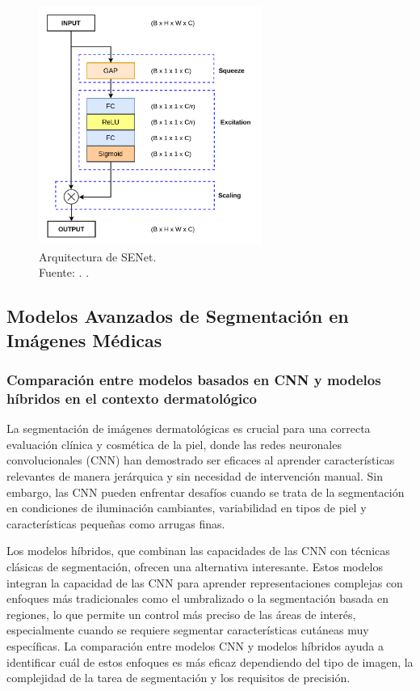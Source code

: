 \begin{itemize}
	\begin{figure}[H]
		\begin{center}
			\includegraphics[width=0.65\textwidth]{2/figures/senet.png}
			\caption[Arquitectura de SENet]{Arquitectura de SENet.\\
			Fuente: \cite{autor2022cnn}. .}
			\label{2:figarqsenet}
		\end{center}
	\end{figure}

\end{itemize}


\subsection{Modelos Avanzados de Segmentación en Imágenes Médicas}
%
\subsubsection{Comparación entre modelos basados en CNN y modelos híbridos en el contexto dermatológico}
La segmentación de imágenes dermatológicas es crucial para una correcta evaluación clínica y cosmética de la piel, donde las redes neuronales convolucionales (CNN) han demostrado ser eficaces al aprender características relevantes de manera jerárquica y sin necesidad de intervención manual. Sin embargo, las CNN pueden enfrentar desafíos cuando se trata de la segmentación en condiciones de iluminación cambiantes, variabilidad en tipos de piel y características pequeñas como arrugas finas.

Los modelos híbridos, que combinan las capacidades de las CNN con técnicas clásicas de segmentación, ofrecen una alternativa interesante. Estos modelos integran la capacidad de las CNN para aprender representaciones complejas con enfoques más tradicionales como el umbralizado o la segmentación basada en regiones, lo que permite un control más preciso de las áreas de interés, especialmente cuando se requiere segmentar características cutáneas muy específicas. La comparación entre modelos CNN y modelos híbridos ayuda a identificar cuál de estos enfoques es más eficaz dependiendo del tipo de imagen, la complejidad de la tarea de segmentación y los requisitos de precisión.

